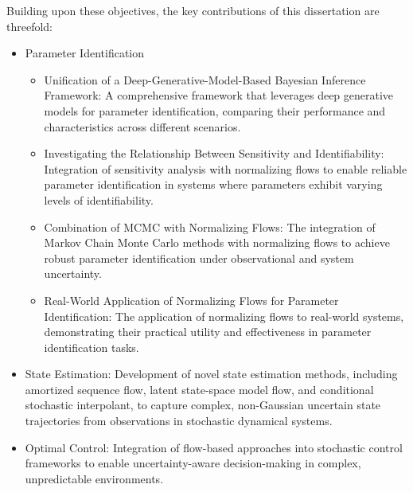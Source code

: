 Building upon these objectives, the key contributions of this dissertation are threefold:
\begin{itemize}
    \item Parameter Identification
    \begin{itemize}
        \item Unification of a Deep-Generative-Model-Based Bayesian Inference Framework: A comprehensive framework that leverages deep generative models for parameter identification, comparing their performance and characteristics across different scenarios.
        \item Investigating the Relationship Between Sensitivity and Identifiability: Integration of sensitivity analysis with normalizing flows to enable reliable parameter identification in systems where parameters exhibit varying levels of identifiability.
        \item Combination of MCMC with Normalizing Flows: The integration of Markov Chain Monte Carlo methods with normalizing flows to achieve robust parameter identification under observational and system uncertainty.
        \item Real-World Application of Normalizing Flows for Parameter Identification: The application of normalizing flows to real-world systems, demonstrating their practical utility and effectiveness in parameter identification tasks.
    \end{itemize} 
    \item State Estimation: Development of novel state estimation methods, including amortized sequence flow, latent state-space model flow, and conditional stochastic interpolant, to capture complex, non-Gaussian uncertain state trajectories from observations in stochastic dynamical systems.
    \item Optimal Control: Integration of flow-based approaches into stochastic control frameworks to enable uncertainty-aware decision-making in complex, unpredictable environments.
\end{itemize}